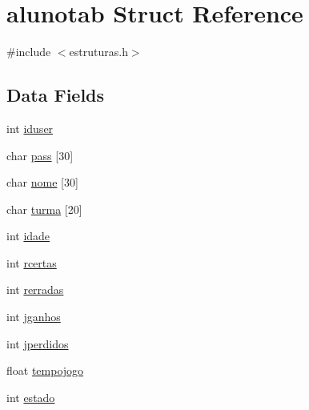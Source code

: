 \hypertarget{structalunotab}{\section{alunotab Struct Reference}
\label{structalunotab}
}


{\ttfamily \#include $<$estruturas.\+h$>$}

\subsection*{Data Fields}
\begin{DoxyCompactItemize}
\item 
int \hyperlink{structalunotab_a88ae70d9ec7db32d42e9c618ad2dc395}{iduser}
\item 
char \hyperlink{structalunotab_a9ecdcb8aa2df05bd6ed832156a1a4c7e}{pass} \mbox{[}30\mbox{]}
\item 
char \hyperlink{structalunotab_af252717e896ebe272fa0db3574565cbd}{nome} \mbox{[}30\mbox{]}
\item 
char \hyperlink{structalunotab_adf62f1a9af1a2877f344edf62a10a24f}{turma} \mbox{[}20\mbox{]}
\item 
int \hyperlink{structalunotab_ad5ea2e19b7deb827930edce70e13e3b8}{idade}
\item 
int \hyperlink{structalunotab_a33bf6e16a78990a2b2d342483bac9a68}{rcertas}
\item 
int \hyperlink{structalunotab_afada030668b28f4d296f891aa53344c5}{rerradas}
\item 
int \hyperlink{structalunotab_a08835a4b6a4ddba9b439cc2de6f60131}{jganhos}
\item 
int \hyperlink{structalunotab_a561b89de55f860dd9b52a0696943e2f1}{jperdidos}
\item 
float \hyperlink{structalunotab_a3de22f50610e62bbdc72498b64622177}{tempojogo}
\item 
int \hyperlink{structalunotab_a876d08c1d21086e4fd228744da10d028}{estado}
\end{DoxyCompactItemize}


